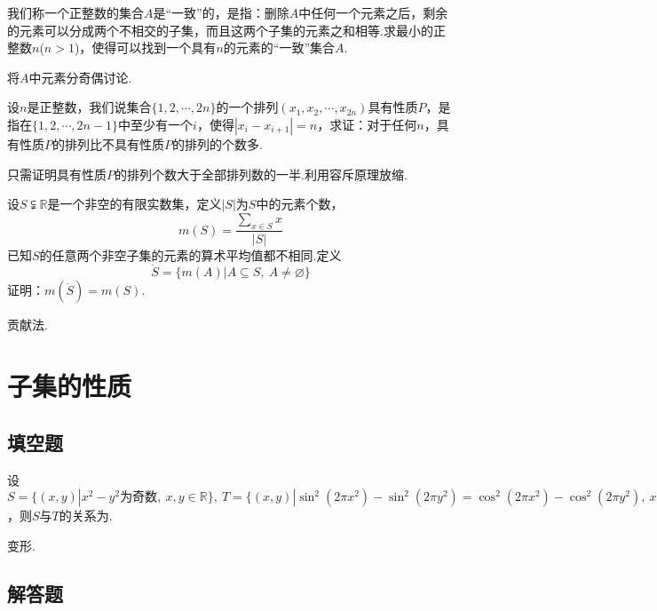 \documentclass[lang=cn, zihao=4.5]{elegantbook}
\newcommand{\tk}{\uline{\hspace{4em}}}
\newcommand{\R}{\mathbb{R}}
\begin{document}
\begin{example} %
	我们称一个正整数的集合$A$是“一致”的，是指：删除$A$中任何一个元素之后，剩余的元素可以分成两个不相交的子集，而且这两个子集的元素之和相等.求最小的正整数$n$($n>1$)，使得可以找到一个具有$n$的元素的“一致”集合$A$.
\end{example}
\begin{hint}
	将$A$中元素分奇偶讨论.
\end{hint}

\begin{example} %
	设$n$是正整数，我们说集合$\{ 1,2, \cdots ,2n \}$的一个排列$(x_1,x_2, \cdots ,x_{2n})$具有性质$P$，是指在$\{ 1,2, \cdots ,2n-1 \}$中至少有一个$i$，使得$|x_i-x_{i+1}|=n$，求证：对于任何$n$，具有性质$P$的排列比不具有性质$P$的排列的个数多.
\end{example}
\begin{hint}
	只需证明具有性质$P$的排列个数大于全部排列数的一半.利用容斥原理放缩.
\end{hint}

\begin{example} %
	设$S \subsetneqq \mathbb{R}$是一个非空的有限实数集，定义$|S|$为$S$中的元素个数，$$m(S) = \frac{\sum_{x \in S} x}{|S|}$$
	已知$S$的任意两个非空子集的元素的算术平均值都不相同.定义$$\dot{S} = \{ m(A) | A \subseteq S, ~A \neq \varnothing \}$$
	证明：$m(\dot{S}) = m(S)$.
\end{example}
\begin{hint}
	贡献法.
\end{hint}

\newpage
\section{子集的性质}

\subsection*{填空题}

\begin{example} %
	设$S=\{ (x,y)|x^2-y^2 \text{为奇数},~x,y \in \R \},~ T=\{ (x,y)|\sin ^2 (2\pi x^2) - \sin ^2 (2\pi y^2) = \cos ^2 (2\pi x^2) - \cos ^2 (2\pi y^2),~ x,y \in \R \}$，则$S$与$T$的关系为\tk .
\end{example}
\begin{hint}
	变形.
\end{hint}

\subsection*{解答题}
\end{document}
